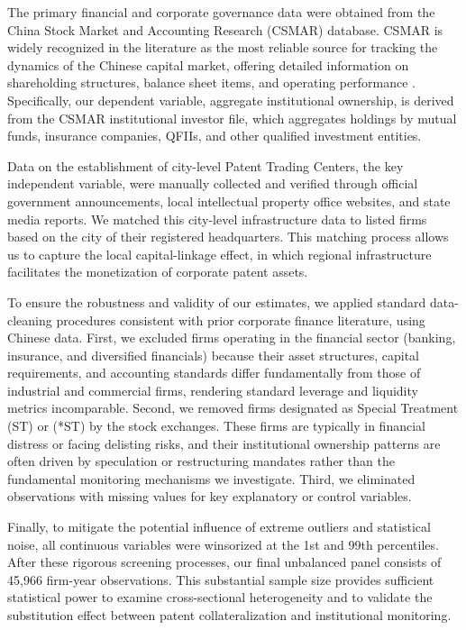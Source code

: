 \documentclass[12pt,a4paper]{article}
\begin{document}
The primary financial and corporate governance data were obtained from the China Stock Market and Accounting Research (CSMAR) database. CSMAR is widely recognized in the literature as the most reliable source for tracking the dynamics of the Chinese capital market, offering detailed information on shareholding structures, balance sheet items, and operating performance \citep{jiang2015product}. Specifically, our dependent variable, aggregate institutional ownership, is derived from the CSMAR institutional investor file, which aggregates holdings by mutual funds, insurance companies, QFIIs, and other qualified investment entities.

Data on the establishment of city-level Patent Trading Centers, the key independent variable, were manually collected and verified through official government announcements, local intellectual property office websites, and state media reports. We matched this city-level infrastructure data to listed firms based on the city of their registered headquarters. This matching process allows us to capture the local capital-linkage effect, in which regional infrastructure facilitates the monetization of corporate patent assets.

To ensure the robustness and validity of our estimates, we applied standard data-cleaning procedures consistent with prior corporate finance literature, using Chinese data. First, we excluded firms operating in the financial sector (banking, insurance, and diversified financials) because their asset structures, capital requirements, and accounting standards differ fundamentally from those of industrial and commercial firms, rendering standard leverage and liquidity metrics incomparable. Second, we removed firms designated as Special Treatment (ST) or (*ST) by the stock exchanges. These firms are typically in financial distress or facing delisting risks, and their institutional ownership patterns are often driven by speculation or restructuring mandates rather than the fundamental monitoring mechanisms we investigate. Third, we eliminated observations with missing values for key explanatory or control variables.

Finally, to mitigate the potential influence of extreme outliers and statistical noise, all continuous variables were winsorized at the 1st and 99th percentiles. After these rigorous screening processes, our final unbalanced panel consists of 45,966 firm-year observations. This substantial sample size provides sufficient statistical power to examine cross-sectional heterogeneity and to validate the substitution effect between patent collateralization and institutional monitoring.
\end{document}
